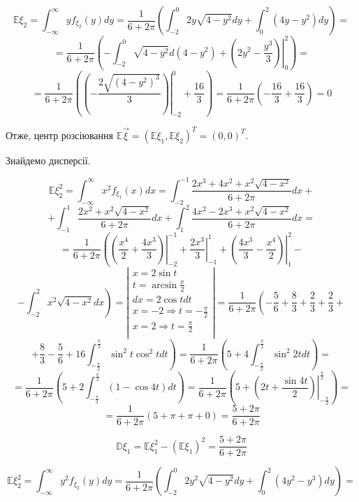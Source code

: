 \documentclass[14pt, a4paper, ukrainian]{extreport}
\begin{document}
	$$\mathbb{E}\xi_2 = \int_{-\infty}^{\infty}yf_{\xi_2}(y)dy =\frac{1}{6+2\pi}\left(\int_{-2}^{0}2y\sqrt{4-y^2}dy + \int_{0}^{2}(4y-y^2)dy\right) = 
	$$
	$$ = \frac{1}{6+2\pi}\left(-\int_{-2}^{0}\sqrt{4-y^2}d(4-y^2) + \left.\left(2y^2 - \frac{y^3}{3}\right)\right|_0^2\right) = 
	$$
	$$ = \frac{1}{6+2\pi}\left(\left.\left(-\frac{2\sqrt{(4-y^2)^3}}{3}\right)\right|_{-2}^0 + \frac{16}{3}\right) =
	 \frac{1}{6+2\pi}\left(-\frac{16}{3} + \frac{16}{3}\right) = 0
	$$
	
	Отже, центр розсіювання $\mathbb{E}\vec\xi = (\mathbb{E}\xi_1, \mathbb{E}\xi_2)^T = (0, 0)^T$.
	
	Знайдемо дисперсії.
	
	$$ \mathbb{E}\xi_2^2 = \int_{-\infty}^{\infty}x^2f_{\xi_1}(x)dx = \int_{-2}^{-1}\frac{2x^3 + 4x^2 + x^2\sqrt{4-x^2}}{6+2\pi}dx +
	$$
	$$ + \int_{-1}^{1}\frac{2x^2 + x^2\sqrt{4-x^2}}{6+2\pi}dx + \int_{1}^{2}\frac{4x^2-2x^3 + x^2\sqrt{4-x^2}}{6+2\pi}dx =
	$$
	$$ = \frac{1}{6+2\pi}\left(\left.\left(\frac{x^4}{2} + \frac{4x^3}{3} \right)\right|_{-2}^{-1} + \left.{\frac{2x^3}{3}}\right|_{-1}^{1} + \left.\left(\frac{4x^3}{3} - \frac{x^4}{2}\right)\right|_{1}^{2} - \right.$$
	$$ - \left.\int_{-2}^{2}x^2\sqrt{4-x^2}dx\right) = \left|
	\begin{matrix}
		x = 2\sin{t}\\
		t = \arcsin{\frac{x}{2}}\\
		dx = 2\cos{t}dt\\
		x = -2 \Rightarrow t = -\frac{\pi}{2}\\
		x = 2 \Rightarrow t = \frac{\pi}{2}\\
	\end{matrix}
	\right| = 
	\frac{1}{6+2\pi} \left(-\frac{5}{6} + \frac{8}{3} + \frac{2}{3} + \frac{2}{3} + \right.
	$$ 
	$$ + \frac{8}{3} - \frac{5}{6} + \left.16\int_{-\frac{\pi}{2}}^{\frac{\pi}{2}}\sin^2{t}\cos^2{t}dt \right) = \frac{1}{6+2\pi}\left(5 + 4 \int_{-\frac{\pi}{2}}^{\frac{\pi}{2}}\sin^2{2t}dt\right) =
	$$
	$$ = \frac{1}{6+2\pi}\left(5 + 2\int_{-\frac{\pi}{2}}^{\frac{\pi}{2}}(1 - \cos{4t})dt\right)
	 = \frac{1}{6+2\pi}\left(5 + \left.\left(2t + \frac{\sin{4t}}{2}\right)\right|_{-\frac{\pi}{2}}^{\frac{\pi}{2}}\right) =
	$$
	$$ = \frac{1}{6+2\pi}\left(5 + \pi + \pi + 0 \right) =
	 \frac{5 + 2\pi}{6+2\pi}
	$$
	
	$$\mathbb{D}\xi_1 = \mathbb{E}\xi_1^2 - (\mathbb{E}\xi_1)^2 =\frac{5 + 2\pi}{6+2\pi} 
	$$	
	
	$$\mathbb{E}\xi_2^2 = \int_{-\infty}^{\infty}y^2f_{\xi_2}(y)dy = \frac{1}{6+2\pi}\left(\int_{-2}^{0}2y^2\sqrt{4-y^2}dy + \int_{0}^{2}(4y^2-y^3)dy\right) =$$
	
\end{document}
